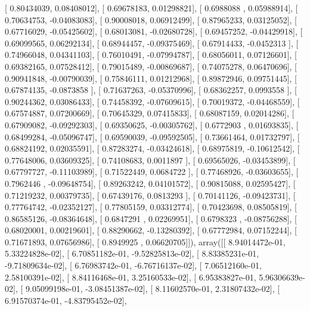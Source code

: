 \documentclass{article}
\begin{document}
       [ 0.80434039,  0.08408012],
       [ 0.69678183,  0.01298821],
       [ 0.6988088 ,  0.05988914],
       [ 0.70634753, -0.04083083],
       [ 0.90008018,  0.06912499],
       [ 0.87965233,  0.03125052],
       [ 0.67716029, -0.05425602],
       [ 0.68013081, -0.02680728],
       [ 0.69457252, -0.04429918],
       [ 0.69099565,  0.06292134],
       [ 0.68944457, -0.09375469],
       [ 0.67914433, -0.0452313 ],
       [ 0.74966048,  0.04341103],
       [ 0.76010491, -0.07994787],
       [ 0.68056011,  0.07126601],
       [ 0.69382165,  0.07528412],
       [ 0.79015489, -0.00869687],
       [ 0.74075278,  0.06470696],
       [ 0.90941848, -0.00790039],
       [ 0.75846111,  0.01212968],
       [ 0.89872946,  0.09751445],
       [ 0.67874135, -0.0873858 ],
       [ 0.71637263, -0.05370996],
       [ 0.68362257,  0.0993558 ],
       [ 0.90244362,  0.03086433],
       [ 0.74458392, -0.07609615],
       [ 0.70019372, -0.04468559],
       [ 0.67574887,  0.07200669],
       [ 0.70645329,  0.07415833],
       [ 0.68087159,  0.02014286],
       [ 0.67909082, -0.09292303],
       [ 0.69350625, -0.00305762],
       [ 0.6772903 ,  0.01693835],
       [ 0.68499284, -0.05096747],
       [ 0.69590039, -0.09592505],
       [ 0.73661464,  0.01732797],
       [ 0.68824192,  0.02035591],
       [ 0.87283274, -0.03424618],
       [ 0.68975819, -0.10612542],
       [ 0.77648006,  0.03609325],
       [ 0.74108683,  0.0011897 ],
       [ 0.69565026, -0.03453899],
       [ 0.67797727, -0.11103989],
       [ 0.71522449,  0.0684722 ],
       [ 0.77468926, -0.03603655],
       [ 0.7962446 , -0.09648754],
       [ 0.89263242,  0.04101572],
       [ 0.90815088,  0.02595427],
       [ 0.71219232,  0.00379735],
       [ 0.67439176,  0.0813293 ],
       [ 0.70141126, -0.09423731],
       [ 0.77764742, -0.02352127],
       [ 0.77805159,  0.03312774],
       [ 0.70423698,  0.08505819],
       [ 0.86585126, -0.08364648],
       [ 0.6847291 ,  0.02269951],
       [ 0.6798323 , -0.08756288],
       [ 0.68020001,  0.00219601],
       [ 0.88290662, -0.13280392],
       [ 0.67772984,  0.07152244],
       [ 0.71671893,  0.07656986],
       [ 0.8949925 ,  0.06620705]]), array([[  8.94014472e-01,   5.33224828e-02],
       [  6.70851182e-01,  -9.52825813e-02],
       [  8.83385231e-01,  -9.71809634e-02],
       [  6.76983742e-01,  -6.76716137e-02],
       [  7.06512160e-01,   2.58100391e-02],
       [  8.84116468e-01,   3.25160533e-02],
       [  6.95383827e-01,   5.96306639e-02],
       [  9.05099198e-01,  -3.08451387e-02],
       [  8.11602570e-01,   2.31807432e-02],
       [  6.91570374e-01,  -4.83795452e-02],
\end{document}
